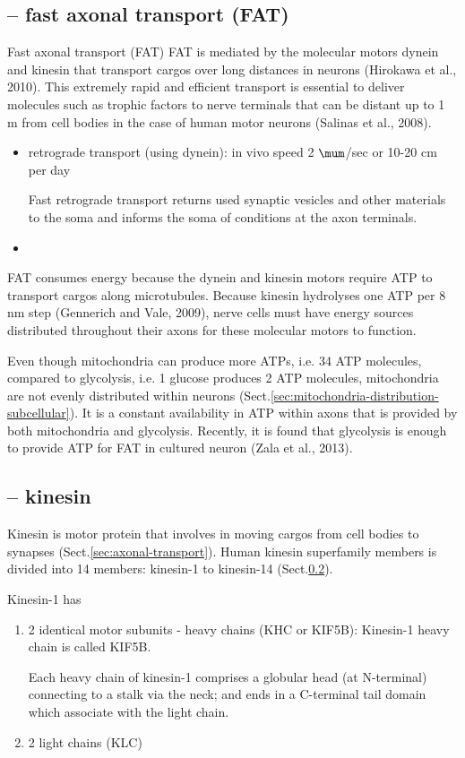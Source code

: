 \subsection{-- fast axonal transport (FAT)}
\label{sec:fast-axonal-transport}

Fast axonal transport (FAT) FAT is mediated by the molecular motors dynein and
kinesin that transport cargos over long distances in neurons (Hirokawa et al.,
2010). This extremely rapid and efficient transport is essential to deliver
molecules such as trophic factors to nerve terminals that can be distant up to 1
m from cell bodies in the case of human motor neurons (Salinas et al., 2008).
\begin{itemize}
  \item retrograde transport (using dynein): in vivo speed 2 $\mum$/sec or 10-20
  cm per day

Fast retrograde transport returns used synaptic vesicles and other materials to
the soma and informs the soma of conditions at the axon terminals.

  \item
\end{itemize}

FAT consumes energy because the dynein and kinesin motors require ATP to
transport cargos along microtubules.
Because kinesin hydrolyses one ATP per 8 nm step (Gennerich and Vale, 2009),
nerve cells must have energy sources distributed throughout their axons for
these molecular motors to function.

Even though mitochondria can produce more ATPs, i.e. 34 ATP molecules, compared
to glycolysis, i.e. 1 glucose produces 2 ATP molecules, mitochondria are not
evenly distributed within neurons
(Sect.\ref{sec:mitochondria-distribution-subcellular}).
It is a constant availability in ATP within axons that is provided by both
mitochondria and glycolysis. Recently, it is found that glycolysis is enough to
provide ATP for FAT in cultured neuron (Zala et al., 2013).

\subsection{-- kinesin}
\label{sec:kinesin}

Kinesin is motor protein that involves in moving cargos from cell bodies to
synapses (Sect.\ref{sec:axonal-transport}). Human kinesin superfamily members is
divided into 14 members: kinesin-1 to kinesin-14 (Sect.\ref{sec:kinesin}).

Kinesin-1 has
\begin{enumerate}
  \item 2 identical motor subunits - heavy chains (KHC or KIF5B):
 Kinesin-1 heavy chain is called KIF5B.

Each heavy chain of kinesin-1 comprises a globular head (at N-terminal)
connecting to a stalk via the neck; and ends in a C-terminal tail domain which
associate with the light chain.

  \item 2 light chains (KLC)
\end{enumerate}


